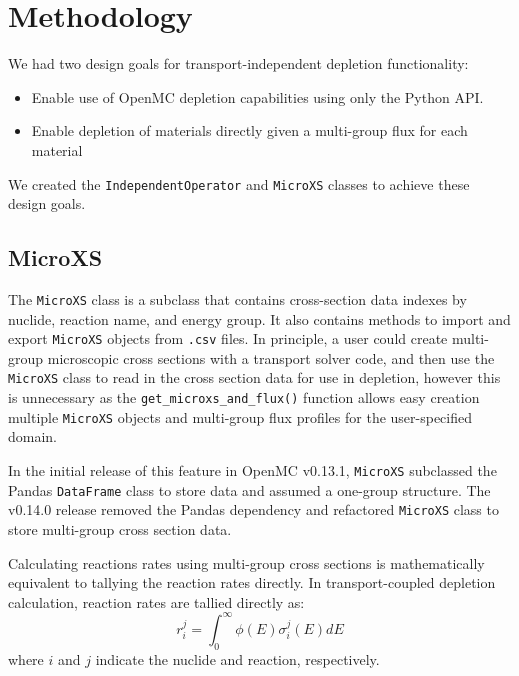 \section{Methodology}
    \label{sec:methods}
    We had two design goals for transport-independent depletion functionality:
    \begin{itemize}
        \item Enable use of OpenMC depletion capabilities using only the Python API.
        \item Enable depletion of materials directly given a multi-group flux
            for each material 
    \end{itemize}
    
    We created the \verb.IndependentOperator. and \verb.MicroXS. classes to
    achieve these design goals.    

    \subsection{MicroXS}
        The \verb.MicroXS. class is a subclass that contains cross-section data
        indexes by nuclide, reaction name, and energy group. It also contains
        methods to import and export \verb.MicroXS. objects from \verb,.csv,
        files. In principle, a user could create multi-group microscopic cross
        sections with a transport solver code, and then use the \verb.MicroXS.
        class to read in the cross section data for use in depletion, however
        this is unnecessary as the \verb.get_microxs_and_flux(). function allows
        easy creation multiple \verb.MicroXS. objects and multi-group flux
        profiles for the user-specified domain.

        In the initial release of this feature in OpenMC v0.13.1, \verb.MicroXS.
        subclassed the Pandas \verb.DataFrame. class to store data and assumed a
        one-group structure. The v0.14.0 release removed the Pandas dependency
        and refactored \verb.MicroXS. class to store multi-group cross section
        data.
        
        Calculating reactions rates using multi-group cross
        sections is mathematically equivalent to tallying the reaction rates
        directly. In transport-coupled depletion calculation, reaction rates
        are tallied directly as:
        \begin{equation}
            r^j_{i} = \int_0^\infty \phi(E) \sigma^j_i(E) dE
        \end{equation}
        where $i$ and $j$ indicate the nuclide and reaction, respectively.

